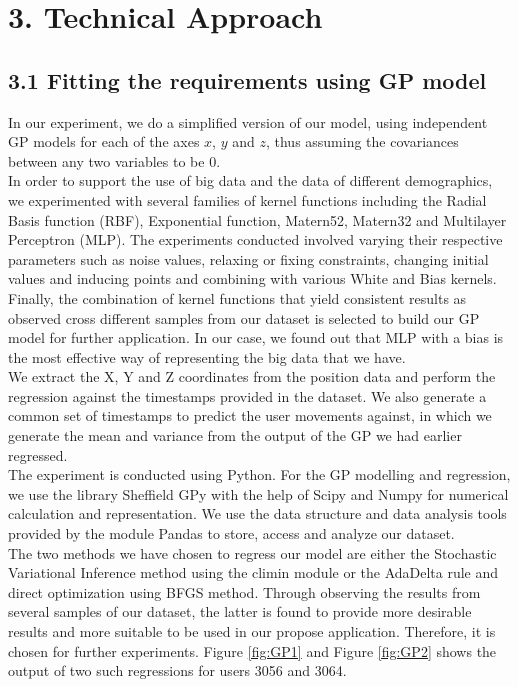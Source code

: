 \documentclass[letterpaper]{article}
\begin{document}
\section{3.  Technical Approach}

\subsection{3.1  Fitting the requirements using GP model}

In our experiment, we do a simplified version of our model, using independent GP models for each of the axes $x$, $y$ and $z$, thus assuming the covariances between any two variables to be $0$. \\

In order to support the use of big data and the data of different demographics, we experimented with several families of kernel functions including the Radial Basis function (RBF), Exponential function, Matern52, Matern32 and Multilayer Perceptron (MLP). The experiments conducted involved varying their respective parameters such as noise values, relaxing or fixing constraints, changing initial values and inducing points and combining with various White and Bias kernels. Finally, the combination of kernel functions that yield consistent results as observed cross different samples from our dataset is selected to build our GP model for further application. In our case, we found out that MLP with a bias is the most effective way of representing the big data that we have.\\

We extract the X, Y and Z coordinates from the position data and perform the regression against the timestamps provided in the dataset. We also generate a common set of timestamps to predict the user movements against, in which we generate the mean and variance from the output of the GP we had earlier regressed. \\

The experiment is conducted using Python. For the GP modelling and regression, we use the library Sheffield GPy with the help of Scipy and Numpy for numerical calculation and representation. We use the data structure and data analysis tools provided by the module Pandas to store, access and analyze our dataset. \\

The two methods we have chosen to regress our model are either the Stochastic Variational Inference method using the climin module or the AdaDelta rule and direct optimization using BFGS method. Through observing the results from several samples of our dataset, the latter is found to provide more desirable results and more suitable to be used in our propose application. Therefore, it is chosen for further experiments. Figure \ref{fig:GP1} and Figure \ref{fig:GP2} shows the output of two such regressions for users 3056 and 3064.
\end{document}

